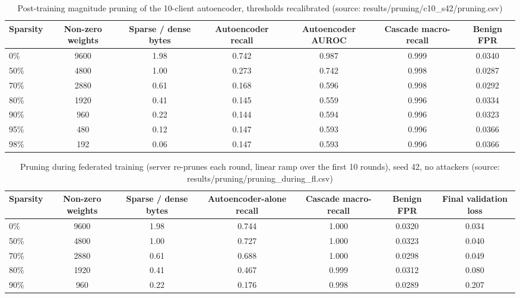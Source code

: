\begin{table}[H]
\centering
\scriptsize
\setlength{\tabcolsep}{3pt}
\renewcommand{\arraystretch}{1.15}
\begin{tabular}{|l|c|c|c|c|c|c|}
\hline
\textbf{Sparsity} & \textbf{Non-zero weights} & \textbf{Sparse / dense bytes} & \textbf{Autoencoder recall} & \textbf{Autoencoder AUROC} & \textbf{Cascade macro-recall} & \textbf{Benign FPR} \\ \hline
0\% & 9600 & 1.98 & 0.742 & 0.987 & 0.999 & 0.0340 \\ \hline
50\% & 4800 & 1.00 & 0.273 & 0.742 & 0.998 & 0.0287 \\ \hline
70\% & 2880 & 0.61 & 0.168 & 0.596 & 0.998 & 0.0292 \\ \hline
80\% & 1920 & 0.41 & 0.145 & 0.559 & 0.996 & 0.0334 \\ \hline
90\% & 960 & 0.22 & 0.144 & 0.594 & 0.996 & 0.0323 \\ \hline
95\% & 480 & 0.12 & 0.147 & 0.593 & 0.996 & 0.0366 \\ \hline
98\% & 192 & 0.06 & 0.147 & 0.593 & 0.996 & 0.0366 \\ \hline
\end{tabular}
\caption{Post-training magnitude pruning of the 10-client autoencoder, thresholds recalibrated (source: results/pruning/c10\_s42/pruning.csv)}
\label{tab:fu_prune_post}
\end{table}

\begin{table}[H]
\centering
\scriptsize
\setlength{\tabcolsep}{3pt}
\renewcommand{\arraystretch}{1.15}
\begin{tabular}{|l|c|c|c|c|c|c|}
\hline
\textbf{Sparsity} & \textbf{Non-zero weights} & \textbf{Sparse / dense bytes} & \textbf{Autoencoder-alone recall} & \textbf{Cascade macro-recall} & \textbf{Benign FPR} & \textbf{Final validation loss} \\ \hline
0\% & 9600 & 1.98 & 0.744 & 1.000 & 0.0320 & 0.034 \\ \hline
50\% & 4800 & 1.00 & 0.727 & 1.000 & 0.0323 & 0.040 \\ \hline
70\% & 2880 & 0.61 & 0.688 & 1.000 & 0.0298 & 0.049 \\ \hline
80\% & 1920 & 0.41 & 0.467 & 0.999 & 0.0312 & 0.080 \\ \hline
90\% & 960 & 0.22 & 0.176 & 0.998 & 0.0289 & 0.207 \\ \hline
\end{tabular}
\caption{Pruning during federated training (server re-prunes each round, linear ramp over the first 10 rounds), seed 42, no attackers (source: results/pruning/pruning\_during\_fl.csv)}
\label{tab:fu_prune_fl}
\end{table}

